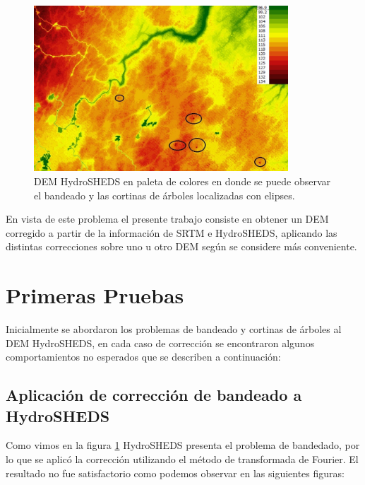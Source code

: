 \documentclass[10pt,a4paper, twoside]{report}
\begin{document}
\begin{figure}[!htb]
   \centering      
   \includegraphics[width=0.85\textwidth]{imagenes/HSHEDSPaleta.jpg}
 \caption{DEM HydroSHEDS en paleta de colores en donde se puede observar el bandeado y las cortinas de árboles localizadas con elipses.}
 \label{HSHEDSPaleta}
\end{figure}


En vista de este problema el presente trabajo consiste en obtener un DEM corregido a partir de la información de SRTM e HydroSHEDS, aplicando las distintas correcciones sobre uno u otro DEM según se considere más conveniente.

\section{Primeras Pruebas}


Inicialmente se abordaron los problemas de bandeado y cortinas de árboles al DEM HydroSHEDS, en cada caso de corrección se encontraron algunos comportamientos no esperados que se describen a continuación:

\subsection{Aplicación de corrección de bandeado a HydroSHEDS}
\label{aplicacionBandeado}

Como vimos en la figura \ref{HSHEDSPaleta} HydroSHEDS presenta el problema de bandedado, por lo que se aplicó la corrección utilizando el método de transformada de Fourier. El resultado no fue satisfactorio como podemos observar en las siguientes figuras:
\end{document}
